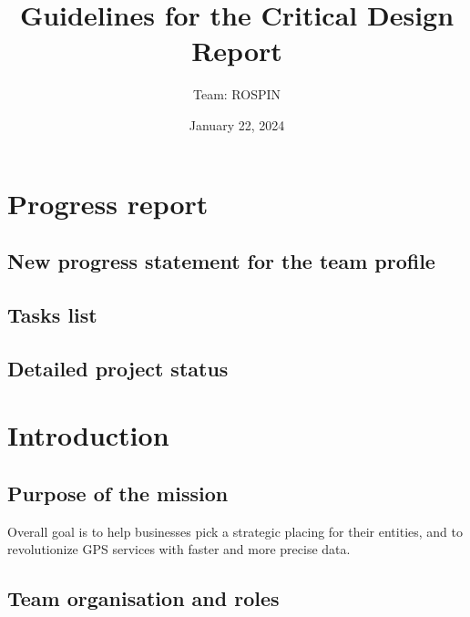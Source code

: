 \documentclass[11pt]{article}
\title{Guidelines for the Critical Design Report
}
\author{Team: ROSPIN}
\date{January 22, 2024}
\begin{document}
\cansattitle

\newpage

\tableofcontents
\pagestyle{plain}

\newpage





\section{Progress report}

\subsection{New progress statement for the team profile}

\subsection{Tasks list}

\subsection{Detailed project status}




\section{Introduction}

\subsection{Purpose of the mission}
Overall goal is to help businesses pick a strategic placing for their entities, and to revolutionize GPS services with faster and more precise data. 

\subsection{Team organisation and roles}
\end{document}
